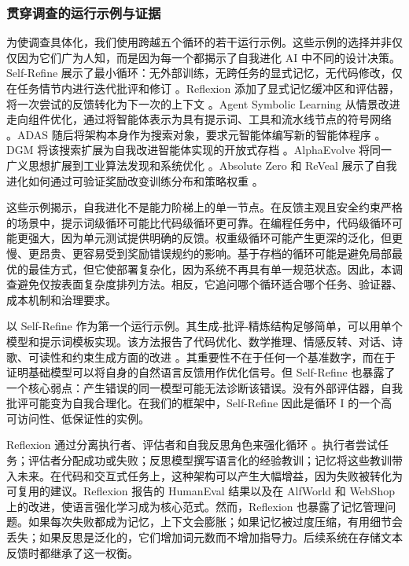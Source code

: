 \subsubsection{贯穿调查的运行示例与证据}

为使调查具体化，我们使用跨越五个循环的若干运行示例。这些示例的选择并非仅仅因为它们广为人知，而是因为每一个都揭示了自我进化 AI 中不同的设计决策。Self-Refine 展示了最小循环：无外部训练，无跨任务的显式记忆，无代码修改，仅在任务情节内进行迭代批评和修订 \cite{selfrefine2023}。Reflexion 添加了显式记忆缓冲区和评估器，将一次尝试的反馈转化为下一次的上下文 \cite{reflexion2023}。Agent Symbolic Learning 从情景改进走向组件优化，通过将智能体表示为具有提示词、工具和流水线节点的符号网络 \cite{agentsymboliclearning2024}。ADAS 随后将架构本身作为搜索对象，要求元智能体编写新的智能体程序 \cite{adas2025}。DGM 将该搜索扩展为自我改进智能体实现的开放式存档 \cite{darwingodelmachine2025}。AlphaEvolve 将同一广义思想扩展到工业算法发现和系统优化 \cite{alphaevolve2025}。Absolute Zero 和 ReVeal 展示了自我进化如何通过可验证奖励改变训练分布和策略权重 \cite{absolutezero2025,reveal2025}。

这些示例揭示，自我进化不是能力阶梯上的单一节点。在反馈主观且安全约束严格的场景中，提示词级循环可能比代码级循环更可靠。在编程任务中，代码级循环可能更强大，因为单元测试提供明确的反馈。权重级循环可能产生更深的泛化，但更慢、更昂贵、更容易受到奖励错误规约的影响。基于存档的循环可能是避免局部最优的最佳方式，但它使部署复杂化，因为系统不再具有单一规范状态。因此，本调查避免仅按表面复杂度排列方法。相反，它追问哪个循环适合哪个任务、验证器、成本机制和治理要求。

以 Self-Refine 作为第一个运行示例。其生成-批评-精炼结构足够简单，可以用单个模型和提示词模板实现。该方法报告了代码优化、数学推理、情感反转、对话、诗歌、可读性和约束生成方面的改进 \cite{selfrefine2023}。其重要性不在于任何一个基准数字，而在于证明基础模型可以将自身的自然语言反馈用作优化信号。但 Self-Refine 也暴露了一个核心弱点：产生错误的同一模型可能无法诊断该错误。没有外部评估器，自我批评可能变为自我合理化。在我们的框架中，Self-Refine 因此是循环 I 的一个高可访问性、低保证性的实例。

Reflexion 通过分离执行者、评估者和自我反思角色来强化循环 \cite{reflexion2023}。执行者尝试任务；评估者分配成功或失败；反思模型撰写语言化的经验教训；记忆将这些教训带入未来。在代码和交互式任务上，这种架构可以产生大幅增益，因为失败被转化为可复用的建议。Reflexion 报告的 HumanEval 结果以及在 AlfWorld 和 WebShop 上的改进，使语言强化学习成为核心范式。然而，Reflexion 也暴露了记忆管理问题。如果每次失败都成为记忆，上下文会膨胀；如果记忆被过度压缩，有用细节会丢失；如果反思是泛化的，它们增加词元数而不增加指导力。后续系统在存储文本反馈时都继承了这一权衡。

